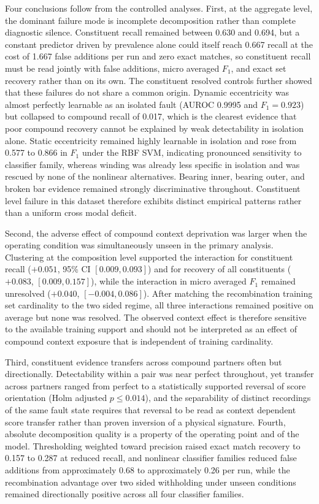 \documentclass{ieeeaccess}
\begin{document}
Four conclusions follow from the controlled analyses. First, at the aggregate
level, the dominant failure mode is incomplete decomposition rather than
complete diagnostic silence. Constituent recall remained between 0.630 and
0.694, but a constant predictor driven by prevalence alone could itself reach
0.667 recall at the cost of 1.667 false additions per run and zero exact
matches, so constituent recall must be read jointly with false additions,
micro averaged $F_1$, and exact set recovery rather than on its own. The constituent resolved controls
further showed that these failures do not share a common origin. Dynamic
eccentricity was almost perfectly learnable as an isolated fault (AUROC
0.9995 and $F_1 = 0.923$) but collapsed to compound recall of 0.017, which is
the clearest evidence that poor compound recovery cannot be explained by weak
detectability in isolation alone. Static eccentricity remained highly
learnable in isolation and rose from 0.577 to 0.866 in $F_1$ under the RBF
SVM, indicating pronounced sensitivity to classifier family, whereas winding
was already less specific in isolation and was rescued by none of the
nonlinear alternatives. Bearing inner, bearing outer, and broken bar evidence
remained strongly discriminative throughout. Constituent level failure in
this dataset therefore exhibits distinct empirical patterns rather than a
uniform cross modal deficit.

Second, the adverse effect of compound context deprivation was larger when
the operating condition was simultaneously unseen in the primary analysis.
Clustering at the composition level supported the interaction for constituent
recall ($+0.051$, 95\% CI $[0.009, 0.093]$) and for recovery of all
constituents ($+0.083$, $[0.009, 0.157]$), while the interaction in micro
averaged $F_1$ remained unresolved ($+0.040$, $[-0.004, 0.086]$). After
matching the recombination training set cardinality to the two sided regime,
all three interactions remained positive on average but none was resolved.
The observed context effect is therefore sensitive to the available training
support and should not be interpreted as an effect of compound context
exposure that is independent of training cardinality.

Third, constituent evidence transfers across compound partners often but
directionally. Detectability within a pair was near perfect throughout, yet
transfer across partners ranged from perfect to a statistically supported
reversal of score orientation (Holm adjusted $p \le 0.014$), and the
separability of distinct recordings of the same fault state requires that
reversal to be read as context dependent score transfer rather than proven
inversion of a physical signature. Fourth, absolute
decomposition quality is a property of the operating point and of the model.
Thresholding weighted toward precision raised exact match recovery to 0.157
to 0.287 at reduced recall, and nonlinear classifier families
reduced false additions from approximately 0.68 to approximately 0.26 per
run, while the recombination advantage over two sided withholding under
unseen conditions remained directionally positive across all four classifier
families.
\end{document}
